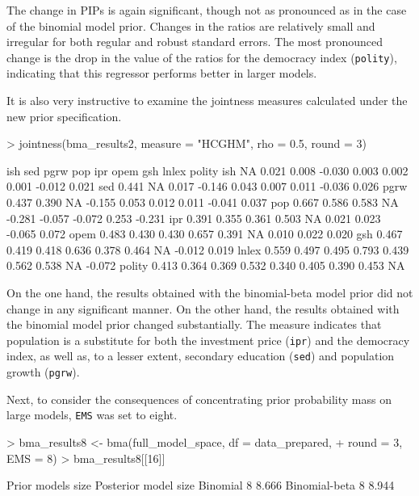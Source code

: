 \documentclass[a4paper]{article}
\begin{document}
\noindent The change in PIPs is again significant, though not as pronounced as in the case of the binomial model prior.
Changes in the ratios are relatively small and irregular for both regular and robust standard errors.
The most pronounced change is the drop in the value of the ratios for the democracy index (\verb+polity+), indicating that this regressor performs better in larger models.

It is also very instructive to examine the jointness measures calculated under the new prior specification.
\begin{Schunk}
\begin{Sinput}
> jointness(bma_results2, measure = "HCGHM", rho = 0.5, round = 3)
\end{Sinput}
\begin{Soutput}
         ish   sed  pgrw    pop    ipr   opem    gsh  lnlex polity
ish       NA 0.021 0.008 -0.030  0.003  0.002  0.001 -0.012  0.021
sed    0.441    NA 0.017 -0.146  0.043  0.007  0.011 -0.036  0.026
pgrw   0.437 0.390    NA -0.155  0.053  0.012  0.011 -0.041  0.037
pop    0.667 0.586 0.583     NA -0.281 -0.057 -0.072  0.253 -0.231
ipr    0.391 0.355 0.361  0.503     NA  0.021  0.023 -0.065  0.072
opem   0.483 0.430 0.430  0.657  0.391     NA  0.010  0.022  0.020
gsh    0.467 0.419 0.418  0.636  0.378  0.464     NA -0.012  0.019
lnlex  0.559 0.497 0.495  0.793  0.439  0.562  0.538     NA -0.072
polity 0.413 0.364 0.369  0.532  0.340  0.405  0.390  0.453     NA
\end{Soutput}
\end{Schunk}
On the one hand, the results obtained with the binomial-beta model prior did not change in any significant manner.
On the other hand, the results obtained with the binomial model prior changed substantially.
The measure indicates that population is a substitute for both the investment price (\verb+ipr+) and the democracy index, as well as, to a lesser extent, secondary education (\verb+sed+) and population growth (\verb+pgrw+).

Next, to consider the consequences of concentrating prior probability mass on large models, \verb+EMS+ was set to eight.
\begin{Schunk}
\begin{Sinput}
> bma_results8 <- bma(full_model_space, df = data_prepared,
+                     round = 3, EMS = 8)
> bma_results8[[16]]
\end{Sinput}
\begin{Soutput}
              Prior models size Posterior model size
Binomial                      8                8.666
Binomial-beta                 8                8.944
\end{Soutput}
\end{Schunk}
\end{document}
